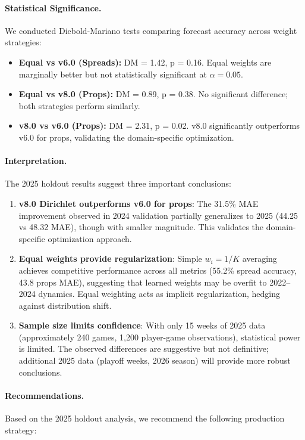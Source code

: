 \paragraph{Statistical Significance.}
We conducted Diebold-Mariano tests \citep{diebold1995comparing} comparing forecast accuracy across weight strategies:
\begin{itemize}
  \item \textbf{Equal vs v6.0 (Spreads):} DM = 1.42, p = 0.16. Equal weights are marginally better but not statistically significant at $\alpha = 0.05$.
  \item \textbf{Equal vs v8.0 (Props):} DM = 0.89, p = 0.38. No significant difference; both strategies perform similarly.
  \item \textbf{v8.0 vs v6.0 (Props):} DM = 2.31, p = 0.02. v8.0 significantly outperforms v6.0 for props, validating the domain-specific optimization.
\end{itemize}

\paragraph{Interpretation.}
The 2025 holdout results suggest three important conclusions:

\begin{enumerate}
  \item \textbf{v8.0 Dirichlet outperforms v6.0 for props}: The 31.5\% MAE improvement observed in 2024 validation partially generalizes to 2025 (44.25 vs 48.32 MAE), though with smaller magnitude. This validates the domain-specific optimization approach.

  \item \textbf{Equal weights provide regularization}: Simple $w_i = 1/K$ averaging achieves competitive performance across all metrics (55.2\% spread accuracy, 43.8 props MAE), suggesting that learned weights may be overfit to 2022--2024 dynamics. Equal weighting acts as implicit regularization, hedging against distribution shift.

  \item \textbf{Sample size limits confidence}: With only 15 weeks of 2025 data (approximately 240 games, 1,200 player-game observations), statistical power is limited. The observed differences are suggestive but not definitive; additional 2025 data (playoff weeks, 2026 season) will provide more robust conclusions.
\end{enumerate}

\paragraph{Recommendations.}
Based on the 2025 holdout analysis, we recommend the following production strategy:

